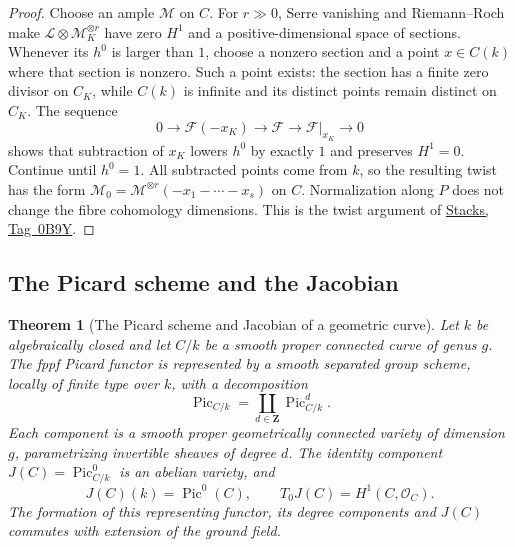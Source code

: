 \documentclass[11pt,a4paper]{article}
\numberwithin{equation}{section}
\newtheorem{theorem}{Theorem}[section]
\theoremstyle{definition}
\theoremstyle{remark}
\newcommand{\stacks}[1]{\href{https://stacks.math.columbia.edu/tag/#1}{\textnormal{Stacks, Tag~#1}}}
\begin{document}
\begin{proof}
Choose an ample $\mathcal M$ on $C$. For $r\gg0$, Serre vanishing
and Riemann--Roch make $\mathcal L\otimes\mathcal M_K^{\otimes r}$
have zero $H^1$ and a positive-dimensional space of sections.
Whenever its $h^0$ is larger than $1$, choose a nonzero section and
a point $x\in C(k)$ where that section is nonzero. Such a point
exists: the section has a finite zero divisor on $C_K$, while
$C(k)$ is infinite and its distinct points remain distinct on $C_K$.
The sequence
\[
 0\longrightarrow\mathcal F(-x_K)
  \longrightarrow\mathcal F
  \longrightarrow\mathcal F|_{x_K}\longrightarrow0
\]
shows that subtraction of $x_K$ lowers $h^0$ by exactly $1$ and
preserves $H^1=0$. Continue until $h^0=1$. All subtracted points
come from $k$, so the resulting twist has the form
$\mathcal M_0=\mathcal M^{\otimes r}(-x_1-\cdots-x_s)$ on $C$.
Normalization along $P$ does not change the fibre cohomology
dimensions. This is the twist argument of \stacks{0B9Y}.
\end{proof}

\subsection{The Picard scheme and the Jacobian}

\begin{theorem}[The Picard scheme and Jacobian of a geometric curve]
\label{app:picard-curve}
Let $k$ be algebraically closed and let $C/k$ be a smooth proper
connected curve of genus $g$. The fppf Picard functor is represented
by a smooth separated group scheme, locally of finite type over $k$,
with a decomposition
\[
 \operatorname{Pic}_{C/k}
   =\coprod_{d\in\mathbf Z}\operatorname{Pic}^d_{C/k}.
\]
Each component is a smooth proper geometrically connected variety of
dimension $g$, parametrizing invertible sheaves of degree $d$.
The identity component
$J(C)=\operatorname{Pic}^0_{C/k}$ is an abelian variety, and
\[
 J(C)(k)=\operatorname{Pic}^0(C),
 \qquad T_0J(C)=H^1(C,\mathcal O_C).
\]
The formation of this representing functor, its degree components
and $J(C)$ commutes with extension of the ground field.
\end{theorem}
\end{document}
